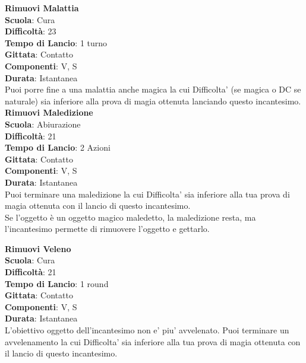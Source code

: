 \begin{multicols}{2}
\medskip\textbf{Rimuovi Malattia}\\
\textbf{Scuola}: Cura\\
\textbf{Difficoltà}: 23\\
\textbf{Tempo di Lancio}: 1 turno\\
\textbf{Gittata}: Contatto\\
\textbf{Componenti}: V, S\\
\textbf{Durata}: Istantanea\\
Puoi porre fine a una malattia anche magica la cui Difficolta' (se magica o DC se naturale) sia inferiore alla prova di magia ottenuta lanciando questo incantesimo.\\

\medskip\textbf{Rimuovi Maledizione}\\
\textbf{Scuola}: Abiurazione\\
\textbf{Difficoltà}: 21\\
\textbf{Tempo di Lancio}: 2 Azioni\\
\textbf{Gittata}: Contatto\\
\textbf{Componenti}: V, S\\
\textbf{Durata}: Istantanea\\
Puoi terminare una maledizione la cui Difficolta' sia inferiore alla tua prova di magia ottenuta con il lancio di questo incantesimo.\\
Se l'oggetto è un oggetto magico maledetto, la maledizione resta, ma l'incantesimo permette di rimuovere l'oggetto e gettarlo.

\medskip\textbf{Rimuovi Veleno}\\
\textbf{Scuola}: Cura\\
\textbf{Difficoltà}: 21\\
\textbf{Tempo di Lancio}: 1 round\\
\textbf{Gittata}: Contatto\\
\textbf{Componenti}: V, S\\
\textbf{Durata}: Istantanea\\
L'obiettivo oggetto dell'incantesimo non e' piu' avvelenato. Puoi terminare un avvelenamento la cui Difficolta' sia inferiore alla tua prova di magia ottenuta con il lancio di questo incantesimo.


\end{multicols}
